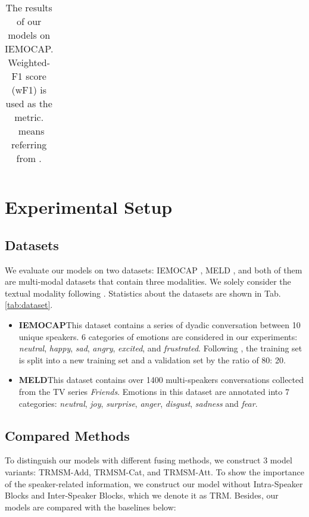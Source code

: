 \documentclass[letterpaper]{article} \usepackage{aaai21}  \usepackage{times}  \usepackage{helvet} \usepackage{courier}  \usepackage[hyphens]{url}  \usepackage{graphicx} \urlstyle{rm} \def\UrlFont{\rm}  \usepackage{natbib}  \usepackage{caption} \usepackage{multirow}
\begin{document}
\begin{table*}
{\begin{tabular}{@{}l|cccccccccccccc@{}}
\end{tabular}}
\caption{The results of our models on IEMOCAP. Weighted-F1 score (wF1) is used as the metric. \dag  \ means referring from \citet{DialogueGCN}. }
\label{tab: iem}
\end{table*}


\section{Experimental Setup}

\subsection{Datasets}
We evaluate our models on two datasets: IEMOCAP \citep{IEMOCAP}, MELD \cite{MELD}, and both of them are multi-modal datasets that contain three modalities. We solely consider the textual modality following \citet{DialogueGCN}. Statistics about the datasets are shown in Tab. \ref{tab:dataset}. 
\begin{itemize}
    \item \textbf{IEMOCAP}\quad This dataset contains a series of dyadic conversation between 10 unique speakers. 6 categories of emotions are considered in our experiments: \textit{neutral}, \textit{happy}, \textit{sad}, \textit{angry}, \textit{excited}, and \textit{frustrated}. Following \citet{DialogueRNN}, the training set is split into a new training set and a validation set by the ratio of 80: 20. 
    
   \item \textbf{MELD}\quad This dataset contains over 1400 multi-speakers conversations collected from the TV series \textit{Friends}.  Emotions in this dataset are annotated into 7 categories: \textit{neutral}, \textit{joy}, \textit{surprise}, \textit{anger}, \textit{disgust}, \textit{sadness} and \textit{fear}.
\end{itemize}

\subsection{Compared Methods}

To distinguish our models with different fusing methods, we construct 3 model variants: TRMSM-Add, TRMSM-Cat, and TRMSM-Att. To show the importance of the speaker-related information, we construct our model without Intra-Speaker Blocks and Inter-Speaker Blocks, which we denote it as TRM. Besides, our models are compared with the baselines below:
\end{document}
